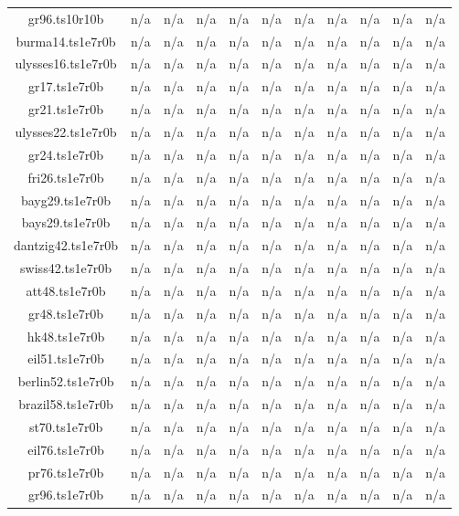 \begin{table}[htbp]
\begin{tabular}{|ccccccccccc|}
gr96.ts10r10b & n/a & n/a & n/a & n/a & n/a & n/a & n/a & n/a & n/a & n/a \\
burma14.ts1e7r0b & n/a & n/a & n/a & n/a & n/a & n/a & n/a & n/a & n/a & n/a \\
ulysses16.ts1e7r0b & n/a & n/a & n/a & n/a & n/a & n/a & n/a & n/a & n/a & n/a \\
gr17.ts1e7r0b & n/a & n/a & n/a & n/a & n/a & n/a & n/a & n/a & n/a & n/a \\
gr21.ts1e7r0b & n/a & n/a & n/a & n/a & n/a & n/a & n/a & n/a & n/a & n/a \\
ulysses22.ts1e7r0b & n/a & n/a & n/a & n/a & n/a & n/a & n/a & n/a & n/a & n/a \\
gr24.ts1e7r0b & n/a & n/a & n/a & n/a & n/a & n/a & n/a & n/a & n/a & n/a \\
fri26.ts1e7r0b & n/a & n/a & n/a & n/a & n/a & n/a & n/a & n/a & n/a & n/a \\
bayg29.ts1e7r0b & n/a & n/a & n/a & n/a & n/a & n/a & n/a & n/a & n/a & n/a \\
bays29.ts1e7r0b & n/a & n/a & n/a & n/a & n/a & n/a & n/a & n/a & n/a & n/a \\
dantzig42.ts1e7r0b & n/a & n/a & n/a & n/a & n/a & n/a & n/a & n/a & n/a & n/a \\
swiss42.ts1e7r0b & n/a & n/a & n/a & n/a & n/a & n/a & n/a & n/a & n/a & n/a \\
att48.ts1e7r0b & n/a & n/a & n/a & n/a & n/a & n/a & n/a & n/a & n/a & n/a \\
gr48.ts1e7r0b & n/a & n/a & n/a & n/a & n/a & n/a & n/a & n/a & n/a & n/a \\
hk48.ts1e7r0b & n/a & n/a & n/a & n/a & n/a & n/a & n/a & n/a & n/a & n/a \\
eil51.ts1e7r0b & n/a & n/a & n/a & n/a & n/a & n/a & n/a & n/a & n/a & n/a \\
berlin52.ts1e7r0b & n/a & n/a & n/a & n/a & n/a & n/a & n/a & n/a & n/a & n/a \\
brazil58.ts1e7r0b & n/a & n/a & n/a & n/a & n/a & n/a & n/a & n/a & n/a & n/a \\
st70.ts1e7r0b & n/a & n/a & n/a & n/a & n/a & n/a & n/a & n/a & n/a & n/a \\
eil76.ts1e7r0b & n/a & n/a & n/a & n/a & n/a & n/a & n/a & n/a & n/a & n/a \\
pr76.ts1e7r0b & n/a & n/a & n/a & n/a & n/a & n/a & n/a & n/a & n/a & n/a \\
gr96.ts1e7r0b & n/a & n/a & n/a & n/a & n/a & n/a & n/a & n/a & n/a & n/a \\

\end{tabular}
\end{table}
